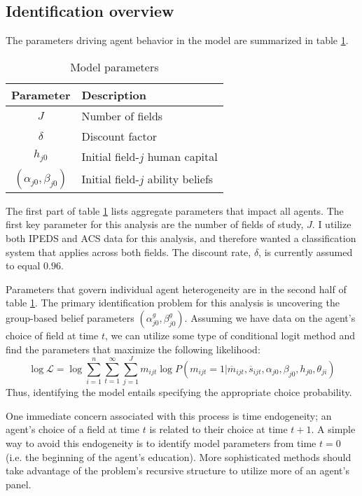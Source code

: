 \documentclass[11 pt]{article}
\begin{document}
\subsection{Identification overview}

The parameters driving agent behavior in the model are summarized in table \ref{tab:parameter_descriptions}.
\begin{table}
\centering
\caption{Model parameters}
\label{tab:parameter_descriptions}
\begin{tabular}{cl}
\hline \hline
Parameter & Description %
\\ \hline
$J$ & Number of fields %
\\
$\delta$ & Discount factor
\\ \hline
$h_{j0}$ & Initial field-$j$ human capital
\\
$(\alpha_{j0}, \beta_{j0})$ & Initial field-$j$ ability beliefs
\\ \hline \hline
\end{tabular}
\end{table}
The first part of table \ref{tab:parameter_descriptions} lists aggregate parameters that impact all agents. 
The first key parameter for this analysis are the number of fields of study, $J$. 
I utilize both IPEDS and ACS data for this analysis, and therefore wanted a classification system that applies across both fields. 
The discount rate, $\delta$, is currently assumed to equal $0.96$.

Parameters that govern individual agent heterogeneity are in the second half of table \ref{tab:parameter_descriptions}.
The primary identification problem for this analysis is uncovering the group-based belief parameters $(\alpha_{j0}^g, \beta_{j0}^g)$.
Assuming we have data on the agent's choice of field at time $t$, we can utilize some type of conditional logit method and find the parameters that maximize the following likelihood:
\begin{equation*}
    \log \mathcal{L} = \log \sum_{i = 1}^n \sum_{t=1}^\infty \sum_{j=1}^J m_{ijt} \log P(m_{ijt} = 1 \vert \overline{m}_{ijt}, \overline{s}_{ijt}, \alpha_{j0}, \beta_{j0}, h_{j0}, \theta_{ji})
\end{equation*}
Thus, identifying the model entails specifying the appropriate choice probability. 

One immediate concern associated with this process is time endogeneity; an agent's choice of a field at time $t$ is related to their choice at time $t+1$. A simple way to avoid this endogeneity is to identify model parameters from time $t=0$ (i.e. the beginning of the agent's education).
More sophisticated methods should take advantage of the problem's recursive structure to utilize more of an agent's panel. 
\end{document}
